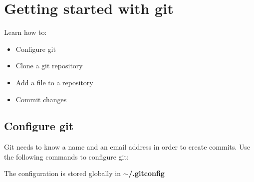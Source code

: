 \section{Getting started with git}
\begin{frame}[fragile]
  \slidetitle

  Learn how to:
  \begin{itemize}
    \item Configure git
    \item Clone a git repository
    \item Add a file to a repository
    \item Commit changes
  \end{itemize}
\end{frame}

\subsection{Configure git}
\begin{frame}[fragile]
  \subslidetitle
  Git needs to know a name and an email address in order to create commits.
  \vspace{1em}
  Use the following commands to configure git:
  \begin{itemize}
  \end{itemize}

  The configuration is stored globally in \bf{$\sim$/.gitconfig}
\end{frame}

